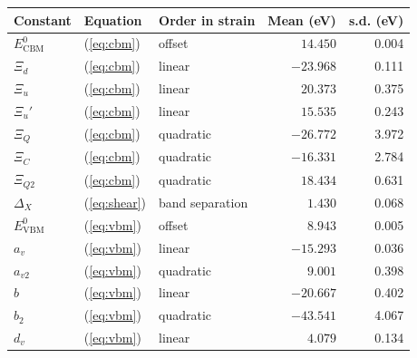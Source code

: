 \begin{tabular}{lllrr}
\toprule
\textbf{Constant} & \textbf{Equation} & \textbf{Order in strain} & \textbf{Mean (eV)} & \textbf{s.d. (eV)} \\
\midrule
$E^{0}_{\mathrm{CBM}}$ & (\ref{eq:cbm}) & offset & $14.450$ & 0.004 \\
$\Xi_d$ & (\ref{eq:cbm}) & linear & $-23.968$ & 0.111 \\
$\Xi_u$ & (\ref{eq:cbm}) & linear & $20.373$ & 0.375 \\
$\Xi_u'$ & (\ref{eq:cbm}) & linear & $15.535$ & 0.243 \\
$\Xi_Q$ & (\ref{eq:cbm}) & quadratic & $-26.772$ & 3.972 \\
$\Xi_C$ & (\ref{eq:cbm}) & quadratic & $-16.331$ & 2.784 \\
$\Xi_{Q2}$ & (\ref{eq:cbm}) & quadratic & $18.434$ & 0.631 \\
$\Delta_X$ & (\ref{eq:shear}) & band separation & $1.430$ & 0.068 \\
$E^{0}_{\mathrm{VBM}}$ & (\ref{eq:vbm}) & offset & $8.943$ & 0.005 \\
$a_v$ & (\ref{eq:vbm}) & linear & $-15.293$ & 0.036 \\
$a_{v2}$ & (\ref{eq:vbm}) & quadratic & $9.001$ & 0.398 \\
$b$ & (\ref{eq:vbm}) & linear & $-20.667$ & 0.402 \\
$b_2$ & (\ref{eq:vbm}) & quadratic & $-43.541$ & 4.067 \\
$d_v$ & (\ref{eq:vbm}) & linear & $4.079$ & 0.134 \\
\bottomrule
\end{tabular}
